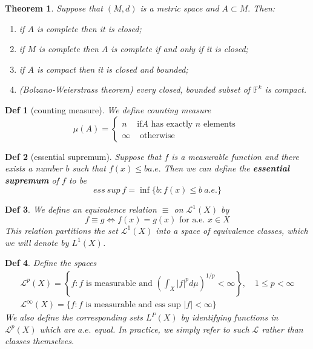 \documentclass[10pt]{paper}
\newtheorem{theorem}{Theorem}[section]
\newtheorem{definition}{Def}[section]
\begin{document}
\begin{theorem}
    Suppose that $(M, d)$ is a metric space and $A \subset M .$ Then:
    \begin{enumerate}
        \item if $A$ is complete then it is closed;
        \item if $M$ is complete then $A$ is complete if and only if it is closed;
        \item if $A$ is compact then it is closed and bounded;
        \item (Bolzano-Weierstrass theorem) every closed, bounded subset of $\mathbb{F}^{k}$ is compact.
    \end{enumerate}
\end{theorem}

\begin{definition}[counting measure]
    We define counting measure
    $$\mu(A)=\left\{\begin{array}{ll}
            n      & \text{if} A \text { has exactly } n \text { elements } \\
            \infty & \text { otherwise }
        \end{array}\right.$$
\end{definition}

\begin{definition}[essential supremum]
    Suppose that $f$ is a measurable function and there exists a number $b$ such that $f(x) \leq b a.e.$ Then we can define the \textbf{essential supremum} of $f$ to be $$ess \ sup \  f=\inf \{b: f(x) \leq b \  a.e. \}$$
\end{definition}

\begin{definition}
    We define an equivalence relation $\equiv$ on $\mathcal{L}^{1}(X)$ by $$f \equiv g \Longleftrightarrow f(x)=g(x) \text { for a.e. } x \in X$$ This relation partitions the set $\mathcal{L}^{1}(X)$ into a space of equivalence classes, which we will denote by $L^{1}(X)$.
\end{definition}

\begin{definition}
    Define the spaces$$\begin{array}{l}
            \mathcal{L}^{p}(X)=\left\{f: f \text { is measurable and }\left(\int_{X}|f|^{p} d \mu\right)^{1 / p}<\infty\right\}, \quad 1 \leq p<\infty \\
            \mathcal{L}^{\infty}(X)=\{f: f \text { is measurable and ess sup }|f|<\infty\}
        \end{array}$$
    We also define the corresponding sets $L^{P}(X)$ by identifying functions in $\mathcal{L}^{p}(X)$ which are $a.e.$ equal. In practice, we simply refer to such $\mathcal{L}$ rather than classes themselves.
\end{definition}
\end{document}
